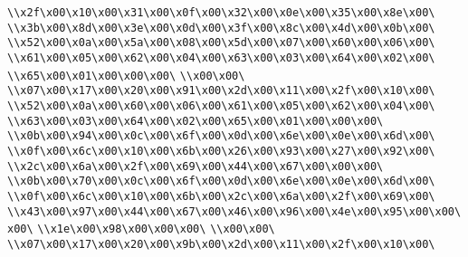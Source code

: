 \verb|\\x2f\x00\x10\x00\x31\x00\x0f\x00\x32\x00\x0e\x00\x35\x00\x8e\x00\|\newline
\verb|\\x3b\x00\x8d\x00\x3e\x00\x0d\x00\x3f\x00\x8c\x00\x4d\x00\x0b\x00\|\newline
\verb|\\x52\x00\x0a\x00\x5a\x00\x08\x00\x5d\x00\x07\x00\x60\x00\x06\x00\|\newline
\verb|\\x61\x00\x05\x00\x62\x00\x04\x00\x63\x00\x03\x00\x64\x00\x02\x00\|\newline
\verb|\\x65\x00\x01\x00\x00\x00\|\newline
\verb|\\x00\x00\|\newline
\verb|\\x07\x00\x17\x00\x20\x00\x91\x00\x2d\x00\x11\x00\x2f\x00\x10\x00\|\newline
\verb|\\x52\x00\x0a\x00\x60\x00\x06\x00\x61\x00\x05\x00\x62\x00\x04\x00\|\newline
\verb|\\x63\x00\x03\x00\x64\x00\x02\x00\x65\x00\x01\x00\x00\x00\|\newline
\verb|\\x0b\x00\x94\x00\x0c\x00\x6f\x00\x0d\x00\x6e\x00\x0e\x00\x6d\x00\|\newline
\verb|\\x0f\x00\x6c\x00\x10\x00\x6b\x00\x26\x00\x93\x00\x27\x00\x92\x00\|\newline
\verb|\\x2c\x00\x6a\x00\x2f\x00\x69\x00\x44\x00\x67\x00\x00\x00\|\newline
\verb|\\x0b\x00\x70\x00\x0c\x00\x6f\x00\x0d\x00\x6e\x00\x0e\x00\x6d\x00\|\newline
\verb|\\x0f\x00\x6c\x00\x10\x00\x6b\x00\x2c\x00\x6a\x00\x2f\x00\x69\x00\|\newline
\verb|\\x43\x00\x97\x00\x44\x00\x67\x00\x46\x00\x96\x00\x4e\x00\x95\x00\x00\x00\|\newline
\verb|\\x1e\x00\x98\x00\x00\x00\|\newline
\verb|\\x00\x00\|\newline
\verb|\\x07\x00\x17\x00\x20\x00\x9b\x00\x2d\x00\x11\x00\x2f\x00\x10\x00\|\newline

